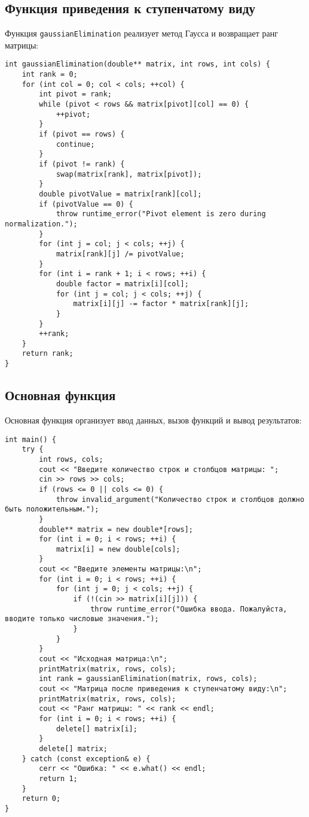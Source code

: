 \documentclass[12pt,a4paper]{scrartcl}
\begin{document}
\subsection*{Функция приведения к ступенчатому виду}
Функция \texttt{gaussianElimination} реализует метод Гаусса и возвращает ранг матрицы:
\begin{verbatim}
int gaussianElimination(double** matrix, int rows, int cols) {
    int rank = 0;
    for (int col = 0; col < cols; ++col) {
        int pivot = rank;
        while (pivot < rows && matrix[pivot][col] == 0) {
            ++pivot;
        }
        if (pivot == rows) {
            continue;
        }
        if (pivot != rank) {
            swap(matrix[rank], matrix[pivot]);
        }
        double pivotValue = matrix[rank][col];
        if (pivotValue == 0) {
            throw runtime_error("Pivot element is zero during normalization.");
        }
        for (int j = col; j < cols; ++j) {
            matrix[rank][j] /= pivotValue;
        }
        for (int i = rank + 1; i < rows; ++i) {
            double factor = matrix[i][col];
            for (int j = col; j < cols; ++j) {
                matrix[i][j] -= factor * matrix[rank][j];
            }
        }
        ++rank;
    }
    return rank;
}
\end{verbatim}

\subsection*{Основная функция}
Основная функция организует ввод данных, вызов функций и вывод результатов:
\begin{verbatim}
int main() {
    try {
        int rows, cols;
        cout << "Введите количество строк и столбцов матрицы: ";
        cin >> rows >> cols;
        if (rows <= 0 || cols <= 0) {
            throw invalid_argument("Количество строк и столбцов должно быть положительным.");
        }
        double** matrix = new double*[rows];
        for (int i = 0; i < rows; ++i) {
            matrix[i] = new double[cols];
        }
        cout << "Введите элементы матрицы:\n";
        for (int i = 0; i < rows; ++i) {
            for (int j = 0; j < cols; ++j) {
                if (!(cin >> matrix[i][j])) {
                    throw runtime_error("Ошибка ввода. Пожалуйста, вводите только числовые значения.");
                }
            }
        }
        cout << "Исходная матрица:\n";
        printMatrix(matrix, rows, cols);
        int rank = gaussianElimination(matrix, rows, cols);
        cout << "Матрица после приведения к ступенчатому виду:\n";
        printMatrix(matrix, rows, cols);
        cout << "Ранг матрицы: " << rank << endl;
        for (int i = 0; i < rows; ++i) {
            delete[] matrix[i];
        }
        delete[] matrix;
    } catch (const exception& e) {
        cerr << "Ошибка: " << e.what() << endl;
        return 1;
    }
    return 0;
}
\end{verbatim}
\end{document}
